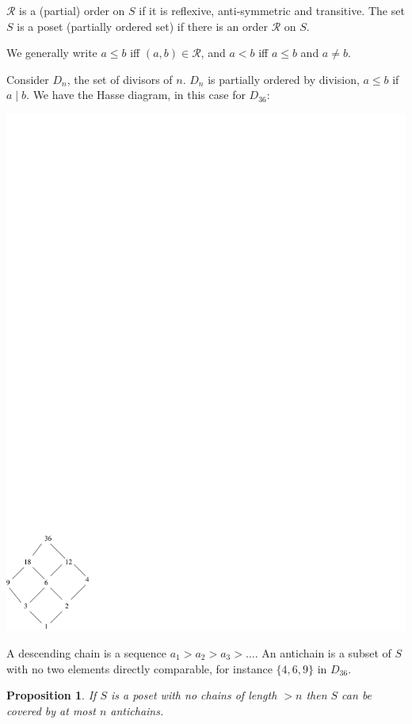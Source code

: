 \documentclass{notes}
\theoremstyle{plain}
\newtheorem*{proposition}{Proposition}
\newcommand{\relset}{\mathcal{R}}
\begin{document}
$\relset$ is a (partial) order on $S$ if it is reflexive, anti-symmetric
and transitive.  The set $S$ is a poset (partially ordered set) if there
is an order $\relset$ on $S$.

We generally write $a \le b$ iff $(a,b) \in \relset$, and $a < b$ iff
$a \le b$ and $a \neq b$.

Consider $D_n$, the set of divisors of $n$.  $D_n$ is partially ordered
by division, $a \le b$ if $a \mid b$.  We have the Hasse diagram, in this
case for $D_{36}$:

\begin{center}
\includegraphics{hasse}
\end{center}

A descending chain is a sequence $a_1 > a_2 > a_3 > \dots$.  An
antichain is a subset of $S$ with no two elements directly comparable,
for instance $\{4,6,9\}$ in $D_{36}$.

\begin{proposition}
If $S$ is a poset with no chains of length $> n$ then $S$ can be covered
by at most $n$ antichains.
\end{proposition}
\end{document}
